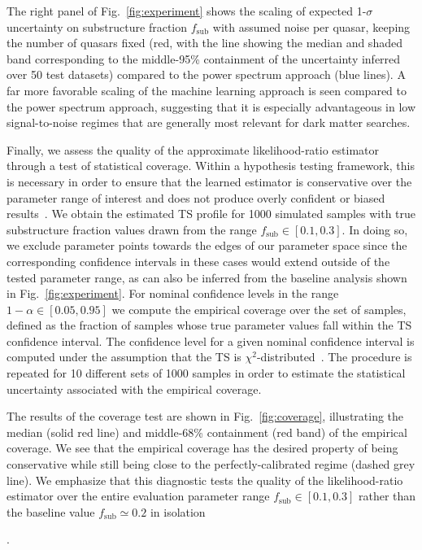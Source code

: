 \documentclass[twocolumn]{aastex631}
\begin{document}
The right panel of Fig.~\ref{fig:experiment} shows the scaling of expected 1-$\sigma$ uncertainty on substructure fraction $f_\mathrm{sub}$ with assumed noise per quasar, keeping the number of quasars fixed (red, with the line showing the median and shaded band corresponding to the middle-95\% containment of the uncertainty inferred over 50 test datasets) compared to the power spectrum approach (blue lines). A far more favorable scaling of the machine learning approach is seen compared to the power spectrum approach, suggesting that it is especially advantageous in low signal-to-noise regimes that are generally most relevant for dark matter searches.

{Finally, we assess the quality of the approximate likelihood-ratio estimator through a test of statistical coverage. Within a hypothesis testing framework, this is necessary in order to ensure that the learned estimator is conservative over the parameter range of interest and does not produce overly confident or biased results~\citep{hermans2021averting}. We obtain the estimated TS profile for 1000 simulated samples with true substructure fraction values drawn from the range $f_\mathrm{sub}\in[0.1, 0.3]$. In doing so, we exclude parameter points towards the edges of our parameter space since the corresponding confidence intervals in these cases would extend outside of the tested parameter range, as can also be inferred from the baseline analysis shown in Fig.~\ref{fig:experiment}. For nominal confidence levels in the range $1-\alpha\in[0.05, 0.95]$ we compute the empirical coverage over the set of samples, defined as the fraction of samples whose true parameter values fall within the TS confidence interval. The confidence level for a given nominal confidence interval is computed under the assumption that the TS is $\chi^2$-distributed~\citep{10.1214/aoms/1177732360}. The procedure is repeated for 10 different sets of 1000 samples in order to estimate the statistical uncertainty associated with the empirical coverage.

The results of the coverage test are shown in Fig.~\ref{fig:coverage}, illustrating the median (solid red line) and middle-68\% containment (red band) of the empirical coverage. We see that the empirical coverage has the desired property of being conservative while still being close to the perfectly-calibrated regime (dashed grey line). We emphasize that this diagnostic tests the quality of the likelihood-ratio estimator over the entire evaluation parameter range $f_\mathrm{sub}\in[0.1, 0.3]$ rather than the baseline value $f_\mathrm{sub}\simeq0.2$ in isolation}.
\end{document}
